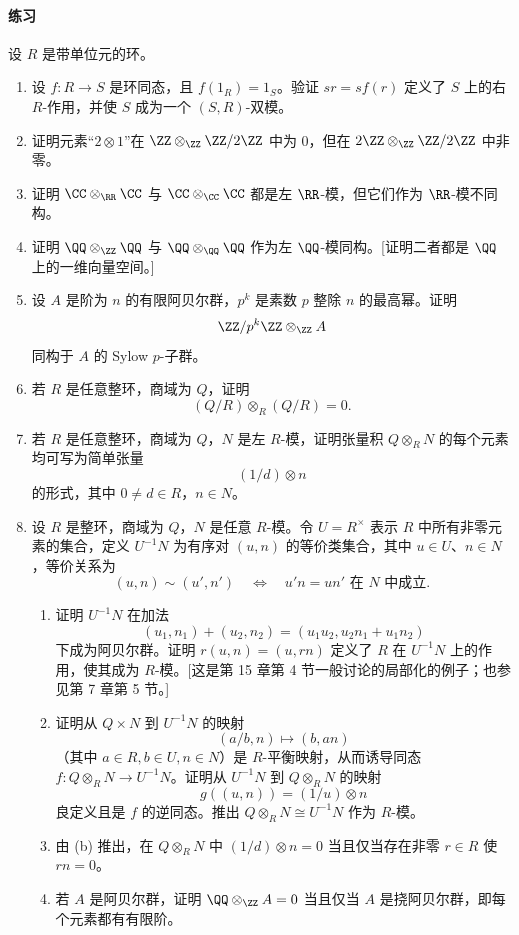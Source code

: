 \paragraph{练习}
设 $R$ 是带单位元的环。
\begin{enumerate}[label=\arabic*.]
	\item 设 $f:R\to S$ 是环同态，且 $f(1_R)=1_S$。验证 $sr=sf(r)$ 定义了 $S$ 上的右 $R$-作用，并使 $S$ 成为一个 $(S,R)$-双模。
	\item 证明元素“$2\otimes1$”在 $\ZZ\otimes_{\ZZ}\ZZ/2\ZZ$ 中为 $0$，但在 $2\ZZ\otimes_{\ZZ}\ZZ/2\ZZ$ 中非零。
	\item 证明 $\CC\otimes_{\RR}\CC$ 与 $\CC\otimes_{\CC}\CC$ 都是左 $\RR$-模，但它们作为 $\RR$-模不同构。
	\item 证明 $\QQ\otimes_{\ZZ}\QQ$ 与 $\QQ\otimes_{\QQ}\QQ$ 作为左 $\QQ$-模同构。[证明二者都是 $\QQ$ 上的一维向量空间。]
	\item 设 $A$ 是阶为 $n$ 的有限阿贝尔群，$p^k$ 是素数 $p$ 整除 $n$ 的最高幂。证明
	\[
	\ZZ/p^k\ZZ\otimes_{\ZZ} A
	\]
	同构于 $A$ 的 Sylow $p$-子群。
	\item 若 $R$ 是任意整环，商域为 $Q$，证明
	\[
	(Q/R)\otimes_R(Q/R)=0.
	\]
	\item 若 $R$ 是任意整环，商域为 $Q$，$N$ 是左 $R$-模，证明张量积 $Q\otimes_R N$ 的每个元素均可写为简单张量
	\[
	(1/d)\otimes n
	\]
	的形式，其中 $0\neq d\in R$，$n\in N$。
	\item 设 $R$ 是整环，商域为 $Q$，$N$ 是任意 $R$-模。令 $U=R^\times$ 表示 $R$ 中所有非零元素的集合，定义 $U^{-1}N$ 为有序对 $(u,n)$ 的等价类集合，其中 $u\in U$、$n\in N$，等价关系为
	\[
	(u,n)\sim(u',n')\quad\Longleftrightarrow\quad u'n=un'\text{ 在 }N\text{ 中成立}.
	\]
	\begin{enumerate}[label=(\alph*)]
		\item 证明 $U^{-1}N$ 在加法
		\[
		(u_1,n_1)+(u_2,n_2)=(u_1u_2,u_2n_1+u_1n_2)
		\]
		下成为阿贝尔群。证明 $r(u,n)=(u,rn)$ 定义了 $R$ 在 $U^{-1}N$ 上的作用，使其成为 $R$-模。[这是第 15 章第 4 节一般讨论的局部化的例子；也参见第 7 章第 5 节。]
		\item 证明从 $Q\times N$ 到 $U^{-1}N$ 的映射
		\[
		(a/b,n)\longmapsto(b,an)
		\]
		（其中 $a\in R,b\in U,n\in N$）是 $R$-平衡映射，从而诱导同态 $f:Q\otimes_RN\to U^{-1}N$。证明从 $U^{-1}N$ 到 $Q\otimes_RN$ 的映射
		\[
		g((u,n))=(1/u)\otimes n
		\]
		良定义且是 $f$ 的逆同态。推出 $Q\otimes_RN\cong U^{-1}N$ 作为 $R$-模。
		\item 由 (b) 推出，在 $Q\otimes_RN$ 中 $(1/d)\otimes n=0$ 当且仅当存在非零 $r\in R$ 使 $rn=0$。
		\item 若 $A$ 是阿贝尔群，证明 $\QQ\otimes_{\ZZ}A=0$ 当且仅当 $A$ 是挠阿贝尔群，即每个元素都有有限阶。

\end{enumerate}
\end{enumerate}
